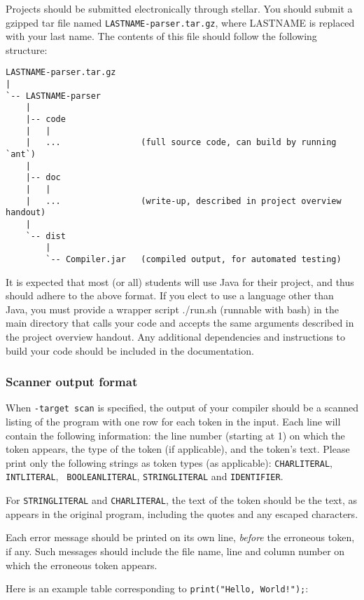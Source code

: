 Projects should be submitted electronically through stellar.  You should
submit a gzipped tar file named {\tt LASTNAME-parser.tar.gz}, where LASTNAME
is replaced with your last name.  The contents of this file should follow
the following structure:

{\scriptsize
\begin{verbatim}
LASTNAME-parser.tar.gz
|
`-- LASTNAME-parser
    |
    |-- code
    |   |
    |   ...                (full source code, can build by running `ant`)
    |
    |-- doc 
    |   |
    |   ...                (write-up, described in project overview handout)
    |   
    `-- dist 
        |
        `-- Compiler.jar   (compiled output, for automated testing)
\end{verbatim}
}

It is expected that most (or all) students will use Java for their project, and
thus should adhere to the above format.  If you elect to use a language other
than Java, you must provide a wrapper script ./run.sh (runnable with bash)
in the main directory that calls your code and accepts the same arguments
described in the project overview handout.  Any additional dependencies
and instructions to build your code should be included in the documentation.

\subsubsection*{Scanner output format}

When {\tt -target scan} is specified, the output of your compiler
should be a scanned listing of the program with one row for each
token in the input. Each line will contain the following
information: the line number (starting at 1) on which the token
appears, the type of the token (if applicable), and the token's
text. Please print only the following strings as token types (as
applicable): {\tt CHARLITERAL}, {\tt INTLITERAL}, {\tt
BOOLEANLITERAL}, {\tt STRINGLITERAL} and {\tt IDENTIFIER}.

For {\tt STRINGLITERAL} and {\tt CHARLITERAL}, the text of the token
should be the text, as appears in the original program, including
the quotes and any escaped characters.

Each error message should be printed on its own line, {\it before}
the erroneous token, if any.  Such messages should include the file
name, line and column number on which the erroneous token appears.

Here is an example table corresponding to {\tt print("Hello,
  World!");}:

